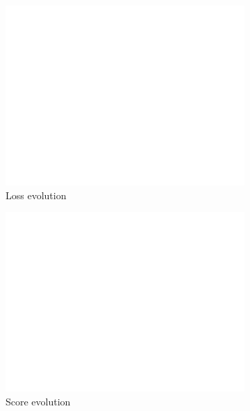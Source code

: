 \documentclass[10pt, a4paper]{article}
\begin{document}
\begin{figure}[htpb]
  \centering
  \begin{subfigure}[b]{0.32\textwidth}
      \centering
      \includegraphics[width=\textwidth]{images/Patch32_scratch_loss.pdf}
      \caption{Loss evolution}
      \label{fig:q2a_loss}
  \end{subfigure}
  \hfill
  \begin{subfigure}[b]{0.32\textwidth}
    \centering
    \includegraphics[width=\textwidth]{images/Patch32_scratch_score.pdf}
    \caption{Score evolution}
    \label{fig:q2a_score}
  \end{subfigure}
  \hfill
  \begin{subfigure}[b]{0.32\textwidth}

\end{subfigure}
\end{figure}
\end{document}
